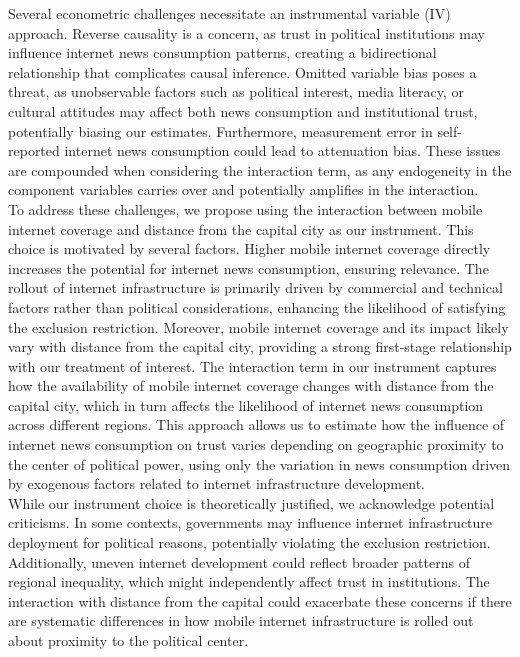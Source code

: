 \documentclass[11pt]{article}
\theoremstyle{plain}
\theoremstyle{plain}
\begin{document}
Several econometric challenges necessitate an instrumental variable (IV) approach. Reverse causality is a concern, as trust in political institutions may influence internet news consumption patterns, creating a bidirectional relationship that complicates causal inference. Omitted variable bias poses a threat, as unobservable factors such as political interest, media literacy, or cultural attitudes may affect both news consumption and institutional trust, potentially biasing our estimates. Furthermore, measurement error in self-reported internet news consumption could lead to attenuation bias. These issues are compounded when considering the interaction term, as any endogeneity in the component variables carries over and potentially amplifies in the interaction.\\

To address these challenges, we propose using the interaction between mobile internet coverage and distance from the capital city as our instrument. This choice is motivated by several factors. Higher mobile internet coverage directly increases the potential for internet news consumption, ensuring relevance. The rollout of internet infrastructure is primarily driven by commercial and technical factors rather than political considerations, enhancing the likelihood of satisfying the exclusion restriction. Moreover, mobile internet coverage and its impact likely vary with distance from the capital city, providing a strong first-stage relationship with our treatment of interest.
The interaction term in our instrument captures how the availability of mobile internet coverage changes with distance from the capital city, which in turn affects the likelihood of internet news consumption across different regions. This approach allows us to estimate how the influence of internet news consumption on trust varies depending on geographic proximity to the center of political power, using only the variation in news consumption driven by exogenous factors related to internet infrastructure development.\\

While our instrument choice is theoretically justified, we acknowledge potential criticisms. In some contexts, governments may influence internet infrastructure deployment for political reasons, potentially violating the exclusion restriction. Additionally, uneven internet development could reflect broader patterns of regional inequality, which might independently affect trust in institutions. The interaction with distance from the capital could exacerbate these concerns if there are systematic differences in how mobile internet infrastructure is rolled out about proximity to the political center.\\
\end{document}
